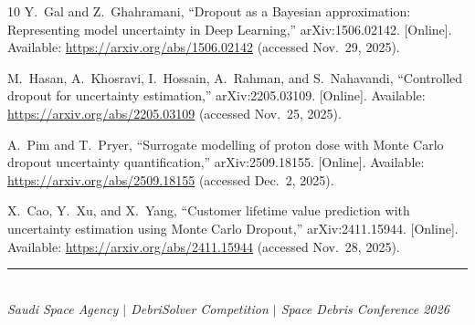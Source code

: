 \documentclass[12pt, a4paper]{article}
\begin{document}
\begin{thebibliography}{10}
Y.~Gal and Z.~Ghahramani,
``Dropout as a Bayesian approximation: Representing model uncertainty in Deep Learning,''
arXiv:1506.02142. [Online]. Available: \url{https://arxiv.org/abs/1506.02142}
(accessed Nov.\ 29, 2025).

M.~Hasan, A.~Khosravi, I.~Hossain, A.~Rahman, and S.~Nahavandi,
``Controlled dropout for uncertainty estimation,''
arXiv:2205.03109. [Online]. Available: \url{https://arxiv.org/abs/2205.03109}
(accessed Nov.\ 25, 2025).

A.~Pim and T.~Pryer,
``Surrogate modelling of proton dose with Monte Carlo dropout uncertainty quantification,''
arXiv:2509.18155. [Online]. Available: \url{https://arxiv.org/abs/2509.18155}
(accessed Dec.\ 2, 2025).

X.~Cao, Y.~Xu, and X.~Yang,
``Customer lifetime value prediction with uncertainty estimation using Monte Carlo Dropout,''
arXiv:2411.15944. [Online]. Available: \url{https://arxiv.org/abs/2411.15944}
(accessed Nov.\ 28, 2025).

\end{thebibliography}

\bigskip
\noindent\rule{\textwidth}{0.4pt}\\[0.3em]
\noindent\textit{Saudi Space Agency $\mid$ DebriSolver Competition $\mid$ Space Debris Conference 2026}
\end{document}
